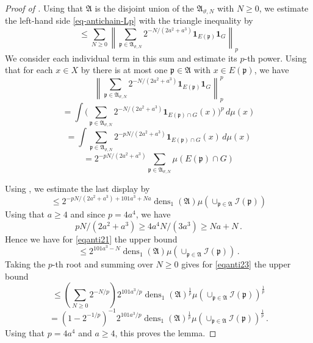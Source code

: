 \documentclass[10pt,a4paper]{article}
\theoremstyle{plain}
\theoremstyle{definition}
\numberwithin{equation}{subsection}
\DeclareMathOperator{\dens}{\operatorname{dens}}
\newcommand{\fp}{{\mathfrak p}}
\newcommand{\scI}{{\mathcal{I}}} %
\newcommand{\mfa}{{\vartheta}}
\newcommand{\proves}[1]{}
\newcommand{\leanok}{}
\begin{document}
\begin{proof}[Proof of ]
\leanok
\proves{antichain-tile-count}

Using that $\mathfrak{A}$ is the disjoint union of the $\mathfrak{A}_{\mfa,N}$ with $N\ge 0$,
we estimate the left-hand side \eqref{eq-antichain-Lp}
with the triangle inequality by
\begin{equation}\label{eqanti23}
\le \sum_{N\ge 0} \left\|\sum_{\fp\in \mathfrak{A}_{\mfa,N}} 2^{-N/(2a^2+a^3)}\mathbf{1}_{E(\fp)} \mathbf{1}_G\right\|_{p}
\end{equation}
We consider each individual term in this sum and estimate its $p$-th power.
Using that for each $x\in X$ by  there is at most one $\fp\in \mathfrak{A}$ with $x\in E(\fp)$, we have
\begin{equation}
    \left\|\sum_{\fp\in \mathfrak{A}_{\mfa,N}} 2^{-N/(2a^2+a^3)}\mathbf{1}_{E(\fp)} \mathbf{1}_G\right\|_{p}^p
\end{equation}
\begin{equation}
    =\int\Big(\sum_{\fp\in \mathfrak{A}_{\mfa,N}}2^{-N/(2a^2+a^3)}\mathbf{1}_{E(\fp)\cap G}(x)\Big)^p\, d\mu(x)
\end{equation}
\begin{equation}
    =\int\sum_{\fp\in\mathfrak{A}_{\mfa,N}}2^{-pN/(2a^2+a^3)}\mathbf{1}_{E(\fp)\cap G}(x)\, d\mu(x)
\end{equation}
\begin{equation}
    = 2^{-pN/(2a^2+a^3)} \sum_{\fp\in\mathfrak{A}_{\mfa,N}}\mu(E(\fp)\cap G)
\end{equation}

Using , we estimate the last display by
\begin{equation}\label{eqanti21}
    \le 2^{-pN/(2a^2+a^3)+101a^3+Na}\dens_1(\mathfrak{A})\mu\left(\cup_{\fp\in\mathfrak{A}}\scI(\fp)\right)
\end{equation}
Using that $a\ge 4$ and since $p = 4a^4$, we have
$$
    pN/(2a^2+a^3)\ge 4a^4N/(3a^3) \ge Na+N\, .
$$
Hence we have for \eqref{eqanti21} the upper bound
$$
    \le 2^{101a^3-N}\dens_1(\mathfrak{A})\mu\left(\cup_{\fp\in\mathfrak{A}}\scI(\fp)\right)\, .
$$
Taking the $p$-th root and summing over $N\ge 0$ gives for \eqref{eqanti23} the upper bound
$$
    \le \left(\sum_{N\ge 0} 2^{-N/p}\right)2^{101a^3/p}\dens_1(\mathfrak{A})^{{\frac{1}{p}}}\mu\left(\cup_{\fp\in\mathfrak{A}}\scI(\fp)\right)^{{\frac{1}{p}}}
$$
$$
    = \left(1-2^{-1/p}\right)^{-1} 2^{101a^3/p} \dens_1(\mathfrak{A})^{\frac 1p}\mu\left(\cup_{\fp\in\mathfrak{A}}\scI(\fp)\right)^{\frac 1p}\, .
$$
Using that $p = 4a^4$ and $a \ge 4$, this proves the lemma.
\end{proof}
\end{document}
